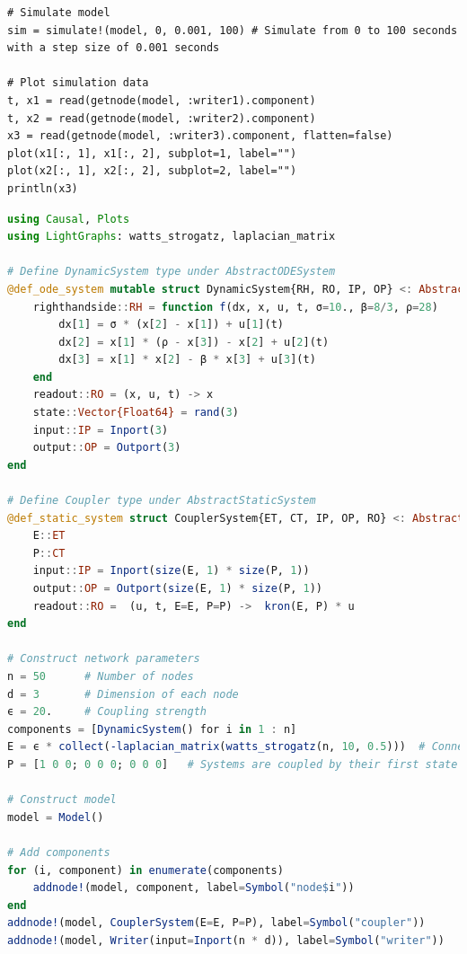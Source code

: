 \documentclass{juliacon}
\begin{document}
\begin{lstlisting}
# Simulate model 
sim = simulate!(model, 0, 0.001, 100) # Simulate from 0 to 100 seconds with a step size of 0.001 seconds

# Plot simulation data 
t, x1 = read(getnode(model, :writer1).component)
t, x2 = read(getnode(model, :writer2).component)
x3 = read(getnode(model, :writer3).component, flatten=false)
plot(x1[:, 1], x1[:, 2], subplot=1, label="")
plot(x2[:, 1], x2[:, 2], subplot=2, label="")   
println(x3)  
\end{lstlisting}

\begin{lstlisting}[caption={Program using Causal.jl for the simulation of the system in Figure \ref{fig: network graph}. Plots.jl is used to plot the simulation data while LightGraphs.jl is used to construct the connectiviy matrix of the network topology \cite{plots, lightgraphs}}, label={lst: network codes}, language=Julia]
using Causal, Plots
using LightGraphs: watts_strogatz, laplacian_matrix

# Define DynamicSystem type under AbstractODESystem
@def_ode_system mutable struct DynamicSystem{RH, RO, IP, OP} <: AbstractODESystem
    righthandside::RH = function f(dx, x, u, t, σ=10., β=8/3, ρ=28)
        dx[1] = σ * (x[2] - x[1]) + u[1](t)
        dx[2] = x[1] * (ρ - x[3]) - x[2] + u[2](t)
        dx[3] = x[1] * x[2] - β * x[3] + u[3](t)
    end
    readout::RO = (x, u, t) -> x
    state::Vector{Float64} = rand(3)
    input::IP = Inport(3)
    output::OP = Outport(3) 
end  

# Define Coupler type under AbstractStaticSystem
@def_static_system struct CouplerSystem{ET, CT, IP, OP, RO} <: AbstractStaticSystem
    E::ET
    P::CT
    input::IP = Inport(size(E, 1) * size(P, 1))
    output::OP = Outport(size(E, 1) * size(P, 1))
    readout::RO =  (u, t, E=E, P=P) ->  kron(E, P) * u
end

# Construct network parameters 
n = 50      # Number of nodes 
d = 3       # Dimension of each node
ϵ = 20.     # Coupling strength 
components = [DynamicSystem() for i in 1 : n]
E = ϵ * collect(-laplacian_matrix(watts_strogatz(n, 10, 0.5)))  # Connectivity matrix of network topology
P = [1 0 0; 0 0 0; 0 0 0]   # Systems are coupled by their first state variable.

# Construct model 
model = Model() 

# Add components
for (i, component) in enumerate(components)
    addnode!(model, component, label=Symbol("node$i"))
end
addnode!(model, CouplerSystem(E=E, P=P), label=Symbol("coupler"))
addnode!(model, Writer(input=Inport(n * d)), label=Symbol("writer"))


\end{lstlisting}
\end{document}
